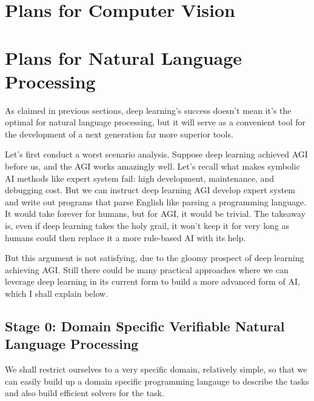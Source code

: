 \documentclass[11pt, oneside]{article}   	%
\theoremstyle{definition}
\begin{document}
\section{Plans for Computer Vision}

\section{Plans for Natural Language Processing}

As claimed in previous sections, deep learning's success doesn't mean it's the optimal for natural language processing, but it will serve as a convenient tool for the development of a next generation far more superior tools.

Let's first conduct a worst scenario analysis. Suppose deep learning achieved AGI before us, and the AGI works amazingly well. Let's recall what makes symbolic AI methods like expert system fail: high development, maintenance, and debugging cost. But we can instruct deep learning AGI develop expert system and write out programs that parse English like parsing a programming language. It would take forever for humans, but for AGI, it would be trivial. The takeaway is, even if deep learning takes the holy grail, it won't keep it for very long as humans could then replace it a more rule-based AI with its help.

But this argument is not satisfying, due to the gloomy prospect of deep learning achieving AGI. Still there could be many practical approaches where we can leverage deep learning in its current form to build a more advanced form of AI, which I shall explain below.

\subsection{Stage 0: Domain Specific Verifiable Natural Language Processing}

We shall restrict ourselves to a very specific domain, relatively simple, so that we can easily build up a domain specific programming langauge to describe the tasks and also build efficient solvers for the task.
\begin{center}
\end{center}
\end{document}
